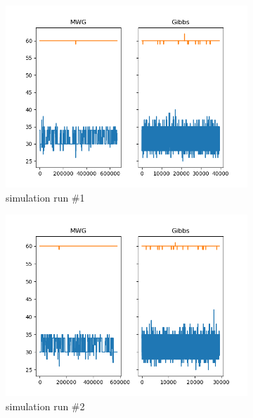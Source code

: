 \begin{figure}[H]
    \centering
    \begin{subfigure}{.3\textwidth}
    	\centering
        \includegraphics[width=\linewidth]{../../plots/Trace_post_burnin_M3_N100_NMCMC3_seed0_diffind2.png}
        \caption{simulation run \#1}
    \end{subfigure}
    \begin{subfigure}{.3\textwidth}
        \centering
    	\includegraphics[width=\linewidth]{../../plots/Trace_post_burnin_M3_N100_NMCMC3_seed1_diffind2.png}
    	\caption{simulation run \#2}
	\end{subfigure}
	\begin{subfigure}{.3\textwidth}
	    \centering

\end{subfigure}
\end{figure}

